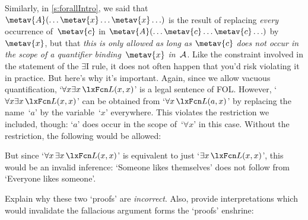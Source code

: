Similarly, in \cref{s:forallIntro}, we said that $\metav{A}(\ldots
\metav{x} \ldots \metav{x}\ldots)$ is the result of replacing
\emph{every} occurrence of~$\metav{c}$ in $\metav{A}(\ldots \metav{c}
\ldots \metav{c}\ldots)$ by~$\metav{x}$, but that \emph{this is only
allowed as long as $\metav{c}$ does not occur in the scope of a
quantifier binding~$\metav{x}$ in~$\mathcal{A}$}. Like the constraint
involved in the statement of the $\exists$I rule, it does not often
happen that you'd risk violating it in practice. But here's why it's
important. Again, since we allow vacuous quantification, `$\forall
x\exists x\,\atom{L}{x,x}$' is a legal sentence of FOL. However,
`$\forall x\exists x\,\atom{L}{x,x}$' can be obtained from `$\forall
x\,\atom{L}{a,x}$' by replacing the name~`$a$' by the variable~`$x$'
everywhere. This violates the restriction we included, though: `$a$'
does occur in the scope of~`$\forall x$' in this case. Without the
restriction, the following would be allowed:
\begin{fitchproof}
	\PR
\ifHTMLtarget
\else
{}
\fi
\end{fitchproof}
But since `$\forall x\, \exists x\, \atom{L}{x,x}$' is equivalent to
just `$\exists x\, \atom{L}{x,x}$', this would be an invalid
inference: `Someone likes themselves' does not follow from `Everyone
likes someone'.

\practiceproblems
\problempart
Explain why these two `proofs' are \emph{incorrect}. Also, provide interpretations which would invalidate the fallacious argument forms the `proofs' enshrine:
\begin{multicols}{2}
	\begin{fitchproof}
		\PR
	\end{fitchproof}
	\begin{fitchproof}
		\hypo{AE}{\forall x\, \exists y\, \atom{R}{x,y}}\PR
		\Ae{AE}
		\open
			\hypo{ass}{\atom{R}{a,a}}\AS
			\Ei{ass}
		\close
		\Ee{E, ass-Ex}
	\end{fitchproof}
\end{multicols}

